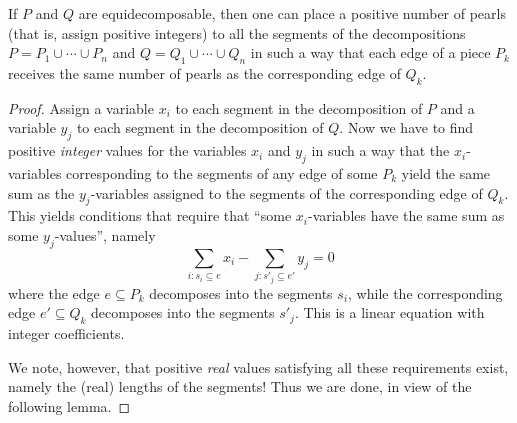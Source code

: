 \begin{lemma}
  \label{pearl_lemma}
  If $P$ and $Q$ are equidecomposable, then one can place
  a positive number of pearls (that is, assign positive integers) to all the
  segments of the decompositions
  $P = P_1 \cup \cdots \cup P_n$ and $Q = Q_1 \cup \cdots \cup Q_n$
  in such a way that each edge of a piece $P_k$ receives the same number of
  pearls as the corresponding edge of $Q_k$.
\end{lemma}
\begin{proof}
  Assign a variable $x_i$ to each segment in the decomposition of $P$
  and a variable $y_j$ to each segment in the decomposition of $Q$. Now we have
  to find positive \emph{integer} values for the variables $x_i$ and $y_j$ in such a way
  that the $x_i$-variables corresponding to the segments of any edge of some $P_k$
  yield the same sum as the $y_j$-variables assigned to the segments of the corresponding
  edge of $Q_k$. This yields conditions that require that ``some
  $x_i$-variables have the same sum as some $y_j$-values'', namely
\[
\sum_{i : s_i \subseteq e} x_i - \sum_{j : s'_j \subseteq e'} y_j = 0
\]
where the edge $e \subseteq P_k$ decomposes into the segments $s_i$, while the
corresponding edge $e' \subseteq Q_k$ decomposes into the segments $s'_j$. This is a linear
equation with integer coefficients.

We note, however, that positive \emph{real} values satisfying all these requirements
exist, namely the (real) lengths of the segments! Thus we are done, in view
of the following lemma.
\end{proof}

